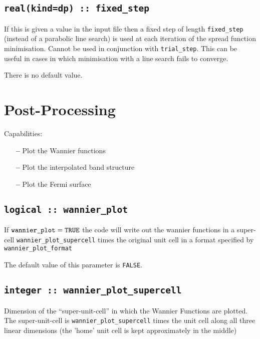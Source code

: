 \subsection[fixed\_step]{\tt real(kind=dp) :: fixed\_step}
If this is given a value in the input file then a fixed step of length
\verb#fixed_step# (instead of a parabolic
line search) is used at each iteration of the spread function
minimisation. Cannot be used in conjunction with
\verb#trial_step#. This can be useful in cases in which minimisation
with a line search fails to converge.

There is no default value.


\section{Post-Processing}

 Capabilities:

\begin{itemize}
\item[{\bf --}]  Plot the Wannier functions
\item[{\bf --}]  Plot the interpolated band structure 		     
\item[{\bf --}]  Plot the Fermi surface 			     
\end{itemize}


\subsection[wannier\_plot]{\tt logical :: wannier\_plot}

If $\verb#wannier_plot#=\verb#TRUE#$ the code will write out the
wannier functions in a super-cell \verb#wannier_plot_supercell# times
the original unit cell in a format specified by
\verb#wannier_plot_format#

The default value of this parameter is \verb#FALSE#.

\subsection[wannier\_plot\_supercell]{\tt integer :: wannier\_plot\_supercell}

Dimension of the ``super-unit-cell'' in which the Wannier Functions are plotted.
The super-unit-cell is \verb#wannier_plot_supercell# times the unit cell along all three
linear dimensions (the 'home' unit cell is kept approximately
in the middle)

